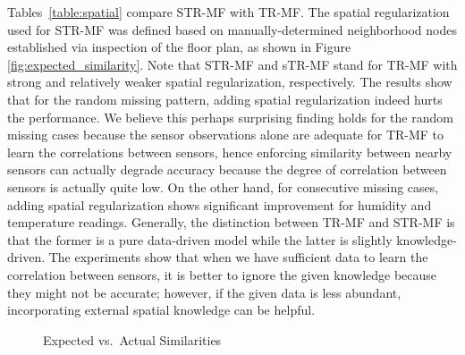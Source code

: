 Tables~\ref{table:spatial} compare STR-MF with TR-MF.
The spatial regularization used for STR-MF was defined based on manually-determined neighborhood nodes established via inspection of the floor plan, as shown in Figure \ref{fig:expected_similarity}.
Note that STR-MF and sTR-MF stand for TR-MF with strong and relatively weaker spatial regularization, respectively.
The results show that for the random missing pattern, adding spatial regularization indeed hurts the performance.
We believe this perhaps surprising finding holds for the random missing cases because the sensor observations alone are adequate for TR-MF to learn the correlations between sensors, hence enforcing similarity between nearby sensors can actually degrade accuracy because the degree of correlation between sensors is actually quite low.
On the other hand, for consecutive missing cases, adding spatial regularization shows significant improvement for humidity and temperature readings.
Generally, the distinction between TR-MF and STR-MF is that the former is a pure data-driven model while the latter is slightly knowledge-driven.
The experiments show that when we have sufficient data to learn the correlation between sensors, it is better to ignore the given knowledge because they might not be accurate; however, if the given data is less abundant, incorporating external spatial knowledge can be helpful.


\begin{figure}[h]
\centering
\vspace{-0.2cm}
\hspace{-0.4cm}
\hspace{-0.4cm}
\vspace{-0.3cm}
\caption{Expected vs.~Actual Similarities}
\label{fig:similarity}
\vspace{-0.3cm}
\end{figure}


